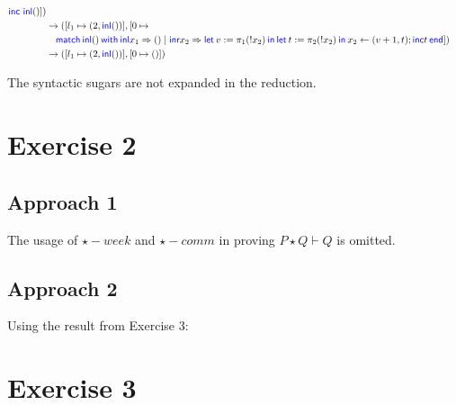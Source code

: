 \documentclass{article}
\begin{document}
\begin{align*}
    \langkw{inc} \ \Inl()])                                                                        \\
     & \cstepsto ([l_1 \mapsto (2, \Inl())], [0 \mapsto                                            \\ & \quad
    \Match{\Inl()}with{\Inl x_1}=>{()}|{\Inr x_2}=>{
    \Let{v}={\pi_1(!x_2)}in \Let{t}={\pi_2(!x_2)}in{x_2 \leftarrow (v+1, t); \langkw{inc} t}
    }end])                                                                                         \\
     & \cstepsto ([l_1 \mapsto (2, \Inl())], [0 \mapsto ()])                                       \\
\end{align*}

The syntactic sugars are not expanded in the reduction.

\section*{Exercise 2}

\subsection*{Approach 1}

\begin{prooftree}
\end{prooftree}

The usage of $\star-week$ and $\star-comm$ in proving $P\star Q \vdash Q$ is omitted.

\subsection*{Approach 2}

Using the result from Exercise 3:

\begin{prooftree}
\end{prooftree}

\section*{Exercise 3}


\begin{prooftree}
\end{prooftree}
\end{document}
